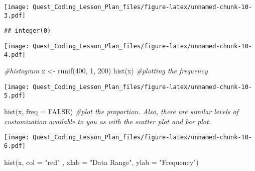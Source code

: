 \documentclass[
]{article}
\newenvironment{Shaded}{\begin{snugshade}}{\end{snugshade}}
\newcommand{\AttributeTok}[1]{\textcolor[rgb]{0.77,0.63,0.00}{#1}}
\newcommand{\CommentTok}[1]{\textcolor[rgb]{0.56,0.35,0.01}{\textit{#1}}}
\newcommand{\ConstantTok}[1]{\textcolor[rgb]{0.00,0.00,0.00}{#1}}
\newcommand{\DecValTok}[1]{\textcolor[rgb]{0.00,0.00,0.81}{#1}}
\newcommand{\FunctionTok}[1]{\textcolor[rgb]{0.00,0.00,0.00}{#1}}
\newcommand{\NormalTok}[1]{#1}
\newcommand{\OtherTok}[1]{\textcolor[rgb]{0.56,0.35,0.01}{#1}}
\newcommand{\SpecialCharTok}[1]{\textcolor[rgb]{0.00,0.00,0.00}{#1}}
\newcommand{\StringTok}[1]{\textcolor[rgb]{0.31,0.60,0.02}{#1}}
\begin{document}
\texttt{[image: Quest\_Coding\_Lesson\_Plan\_files/figure-latex/unnamed-chunk-10-3.pdf]}

\begin{verbatim}
## integer(0)
\end{verbatim}

\begin{Shaded}
\end{Shaded}

\texttt{[image: Quest\_Coding\_Lesson\_Plan\_files/figure-latex/unnamed-chunk-10-4.pdf]}

\begin{Shaded}
\begin{Highlighting}[]
\CommentTok{\#histogram}
\NormalTok{x }\OtherTok{\textless{}{-}} \FunctionTok{runif}\NormalTok{(}\DecValTok{400}\NormalTok{, }\DecValTok{1}\NormalTok{, }\DecValTok{200}\NormalTok{)}
\FunctionTok{hist}\NormalTok{(x) }\CommentTok{\#plotting the frequency}
\end{Highlighting}
\end{Shaded}

\texttt{[image: Quest\_Coding\_Lesson\_Plan\_files/figure-latex/unnamed-chunk-10-5.pdf]}

\begin{Shaded}
\begin{Highlighting}[]
\FunctionTok{hist}\NormalTok{(x, }\AttributeTok{freq =} \ConstantTok{FALSE}\NormalTok{) }\CommentTok{\#plot the proportion. Also, there are similar levels of customization available to you as with the scatter plot and bar plot.}
\end{Highlighting}
\end{Shaded}

\texttt{[image: Quest\_Coding\_Lesson\_Plan\_files/figure-latex/unnamed-chunk-10-6.pdf]}

\begin{Shaded}
\begin{Highlighting}[]
\FunctionTok{hist}\NormalTok{(x, }\AttributeTok{col =} \StringTok{"red"}\NormalTok{ , }\AttributeTok{xlab =} \StringTok{"Data Range"}\NormalTok{, }\AttributeTok{ylab =} \StringTok{"Frequency"}\NormalTok{)}
\end{Highlighting}
\end{Shaded}
\end{document}
